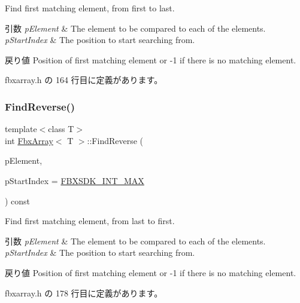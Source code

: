 Find first matching element, from first to last. 
\begin{DoxyParams}{引数}
{\em p\+Element} & The element to be compared to each of the elements. \\
\hline
{\em p\+Start\+Index} & The position to start searching from. \\
\hline
\end{DoxyParams}
\begin{DoxyReturn}{戻り値}
Position of first matching element or -\/1 if there is no matching element. 
\end{DoxyReturn}


 fbxarray.\+h の 164 行目に定義があります。

\mbox{\label{class_fbx_array_ae2dc6ac4c90e3a0724787cec5ebdeb05}} 
\subsubsection{\texorpdfstring{Find\+Reverse()}{FindReverse()}}
{\footnotesize\ttfamily template$<$class T$>$ \\
int \hyperlink{class_fbx_array}{Fbx\+Array}$<$ T $>$\+::Find\+Reverse (\begin{DoxyParamCaption}\item[{const T \&}]{p\+Element,  }\item[{const int}]{p\+Start\+Index = {\ttfamily \hyperlink{fbxtypes_8h_afb502e98178f45295bfde50dd04483d3}{F\+B\+X\+S\+D\+K\+\_\+\+I\+N\+T\+\_\+\+M\+AX}} }\end{DoxyParamCaption}) const\hspace{0.3cm}{\ttfamily [inline]}}

Find first matching element, from last to first. 
\begin{DoxyParams}{引数}
{\em p\+Element} & The element to be compared to each of the elements. \\
\hline
{\em p\+Start\+Index} & The position to start searching from. \\
\hline
\end{DoxyParams}
\begin{DoxyReturn}{戻り値}
Position of first matching element or -\/1 if there is no matching element. 
\end{DoxyReturn}


 fbxarray.\+h の 178 行目に定義があります。

